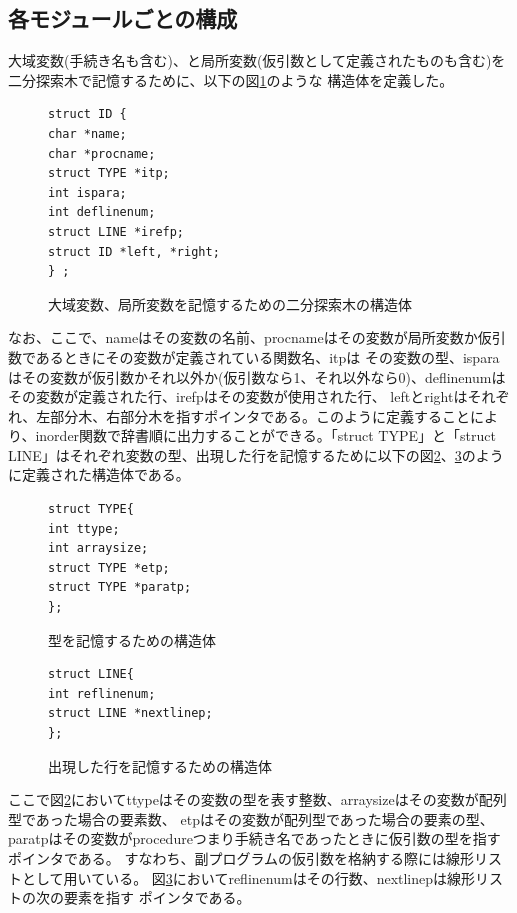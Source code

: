 \documentclass{jarticle}
\begin{document}
\subsection{各モジュールごとの構成}
大域変数(手続き名も含む)、と局所変数(仮引数として定義されたものも含む)を二分探索木で記憶するために、以下の図\ref{code:list}のような
構造体を定義した。
\begin{figure}[H]
\begin{center}
\begin{lstlisting}
struct ID {
char *name;
char *procname;
struct TYPE *itp;
int ispara;
int deflinenum;
struct LINE *irefp;
struct ID *left, *right;
} ;
\end{lstlisting}
\caption{大域変数、局所変数を記憶するための二分探索木の構造体}
\label{code:list}
\end{center}
\end{figure}
なお、ここで、nameはその変数の名前、procnameはその変数が局所変数か仮引数であるときにその変数が定義されている関数名、itpは
その変数の型、isparaはその変数が仮引数かそれ以外か(仮引数なら1、それ以外なら0)、deflinenumはその変数が定義された行、irefpはその変数が使用された行、
leftとrightはそれぞれ、左部分木、右部分木を指すポインタである。このように定義することにより、inorder関数で辞書順に出力することができる。「struct
TYPE」と「struct LINE」はそれぞれ変数の型、出現した行を記憶するために以下の図\ref{code:type}、\ref{code:line}のように定義された構造体である。
\begin{figure}[H]
\begin{center}
\begin{lstlisting}
struct TYPE{
int ttype;
int arraysize;
struct TYPE *etp;
struct TYPE *paratp;
};
\end{lstlisting}
\caption{型を記憶するための構造体}
\label{code:type}
\end{center}
\end{figure}
\begin{figure}[H]
\begin{center}
\begin{lstlisting}
struct LINE{
int reflinenum;
struct LINE *nextlinep;
};
\end{lstlisting}
\caption{出現した行を記憶するための構造体}
\label{code:line}
\end{center}
\end{figure}
ここで図\ref{code:type}においてttypeはその変数の型を表す整数、arraysizeはその変数が配列型であった場合の要素数、
etpはその変数が配列型であった場合の要素の型、paratpはその変数がprocedureつまり手続き名であったときに仮引数の型を指すポインタである。
すなわち、副プログラムの仮引数を格納する際には線形リストとして用いている。
図\ref{code:line}においてreflinenumはその行数、nextlinepは線形リストの次の要素を指す
ポインタである。
\end{document}
